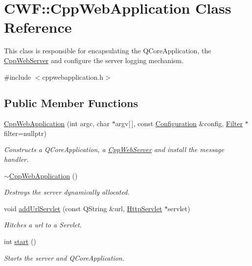 \hypertarget{class_c_w_f_1_1_cpp_web_application}{\section{C\+W\+F\+:\+:Cpp\+Web\+Application Class Reference}
\label{class_c_w_f_1_1_cpp_web_application}
}


This class is responsible for encapsulating the Q\+Core\+Application, the \hyperlink{class_c_w_f_1_1_cpp_web_server}{Cpp\+Web\+Server} and configure the server logging mechanism.  




{\ttfamily \#include $<$cppwebapplication.\+h$>$}

\subsection*{Public Member Functions}
\begin{DoxyCompactItemize}
\item 
\hyperlink{class_c_w_f_1_1_cpp_web_application_a7852928699b0de956fa8f6267fef311c}{Cpp\+Web\+Application} (int argc, char $\ast$argv\mbox{[}$\,$\mbox{]}, const \hyperlink{class_c_w_f_1_1_configuration}{Configuration} \&config, \hyperlink{class_c_w_f_1_1_filter}{Filter} $\ast$filter=nullptr)
\begin{DoxyCompactList}\small\item\em Constructs a Q\+Core\+Application, a \hyperlink{class_c_w_f_1_1_cpp_web_server}{Cpp\+Web\+Server} and install the message handler. \end{DoxyCompactList}\item 
\hyperlink{class_c_w_f_1_1_cpp_web_application_a29277658a0564c06e2b4116d1527513c}{$\sim$\+Cpp\+Web\+Application} ()
\begin{DoxyCompactList}\small\item\em Destroys the server dynamically allocated. \end{DoxyCompactList}\item 
void \hyperlink{class_c_w_f_1_1_cpp_web_application_ac9e3224ae26dea5fc61328ae8c49f22d}{add\+Url\+Servlet} (const Q\+String \&url, \hyperlink{class_c_w_f_1_1_http_servlet}{Http\+Servlet} $\ast$servlet)
\begin{DoxyCompactList}\small\item\em Hitches a url to a Servlet. \end{DoxyCompactList}\item 
int \hyperlink{class_c_w_f_1_1_cpp_web_application_a859f3b5472685da6b2722f9e44b2a2f9}{start} ()
\begin{DoxyCompactList}\small\item\em Starts the server and Q\+Core\+Application. \end{DoxyCompactList}\end{DoxyCompactItemize}



